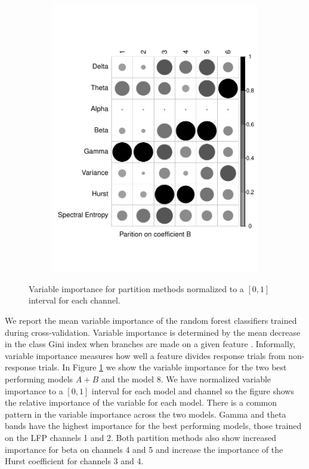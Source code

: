 \begin{figure}[h]
\begin{subfigure}[b]{0.45\textwidth}
    \includegraphics[width = \linewidth, keepaspectratio]{./figs/eeg-AB-corrplot.pdf}%
      \end{subfigure}
  \caption{Variable importance for
   partition methods normalized to 
  a $[0,1]$ interval for each channel.}
    \label{fig:corrplot}
\end{figure}

We report the mean variable importance of the random forest classifiers trained during cross-validation. Variable importance is determined by the mean decrease in the
class Gini index when branches are made on a given feature
\cite{breiman2001}. Informally, variable importance
measures how well a feature divides response trials from non-response
trials. In Figure \ref{fig:corrplot} we show the variable 
importance for the two best performing models $A+B$ and the 
model $8$. We have normalized variable importance to a $[0,1]$ interval for each model and
channel so the figure shows the relative importance of the variable for each model. There is a common pattern in the variable importance across the two models. Gamma and theta bands have the highest importance for the best performing models, those trained on the LFP channels 1 and 2. 
Both partition methods also show increased importance for beta on channels 4 and 5 and increase the importance of the Hurst coefficient for channels 3 and 4. 

